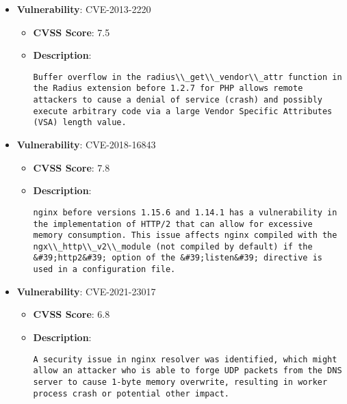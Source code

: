 \documentclass{article}
\begin{document}
\begin{itemize}
        \item \textbf{Vulnerability}: CVE-2013-2220
        \begin{itemize}
            \item \textbf{CVSS Score}:  7.5 
            \item \textbf{Description}:
            \parbox[t]{0.9\linewidth}{
                \verb|Buffer overflow in the radius\\_get\\_vendor\\_attr function in the Radius extension before 1.2.7 for PHP allows remote attackers to cause a denial of service (crash) and possibly execute arbitrary code via a large Vendor Specific Attributes (VSA) length value.|
            }
        \end{itemize}
    
        \item \textbf{Vulnerability}: CVE-2018-16843
        \begin{itemize}
            \item \textbf{CVSS Score}:  7.8 
            \item \textbf{Description}:
            \parbox[t]{0.9\linewidth}{
                \verb|nginx before versions 1.15.6 and 1.14.1 has a vulnerability in the implementation of HTTP/2 that can allow for excessive memory consumption. This issue affects nginx compiled with the ngx\\_http\\_v2\\_module (not compiled by default) if the &#39;http2&#39; option of the &#39;listen&#39; directive is used in a configuration file.|
            }
        \end{itemize}
    
        \item \textbf{Vulnerability}: CVE-2021-23017
        \begin{itemize}
            \item \textbf{CVSS Score}:  6.8 
            \item \textbf{Description}:
            \parbox[t]{0.9\linewidth}{
                \verb|A security issue in nginx resolver was identified, which might allow an attacker who is able to forge UDP packets from the DNS server to cause 1-byte memory overwrite, resulting in worker process crash or potential other impact.|
            }
        \end{itemize}
    

\end{itemize}
\end{document}
